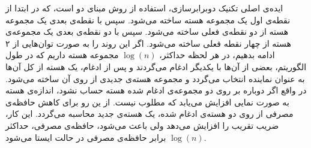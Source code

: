 
ایده‌ی اصلی تکنیک دوبرابرسازی، استفاده از روش مبنای دو است، که در ابتدا از نقطه‌ی اول یک مجموعه هسته ساخته می‌شود.
سپس با نقطه‌ی بعدی یک مجموعه هسته از دو نقطه‌ی فعلی ساخته می‌شود.
سپس با دو نقطه‌ی بعدی یک مجموعه‌ی هسته از چهار نقطه فعلی ساخته می‌شود.
اگر این روند را به صورت توان‌هایی از ۲ ادامه بدهیم، در هر لحظه حداکثر، $\log(n)$ مجموعه هسته داریم که در طول الگوریتم، بعضی از آن‌ها با یکدیگر ادغام می‌گردند و پس از ادغام، یک هسته از کل آن‌ها به عنوان نماینده انتخاب می‌گردد و مجموعه هسته‌ی جدیدی از روی آن ساخته می‌شود.
در واقع اگر دوباره بر روی دو مجموعه‌ی ادغام شده هسته حساب نشود، اندازه‌ی هسته به صورت نمایی افزایش می‌یابد که مطلوب نیست.
از ین رو برای کاهش حافظه‌ی مصرفی از روی دو هسته‌ی ادغام شده، یک هسته‌ی جدید محاسبه می‌گردد.
این کار، ضریب تقریب را افزایش می‌دهد ولی باعث می‌شود، حافظه‌ی مصرفی، حداکثر $\log(n)$ برابر حافظه‌ی مصرفی در حالت ایستا می‌شود.